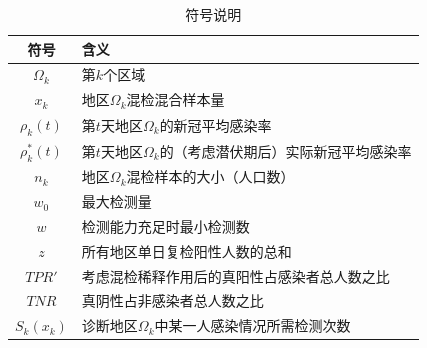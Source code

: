 \documentclass[withoutpreface,bwprint]{cumcmthesis} %
\begin{document}
\begin{table}[H] %
    \begin{center} %
    \caption{符号说明} %
    \begin{tabular}{cl} %
        \toprule %
        \multicolumn{1}{m{3cm}}{\centering 符号} %
        & \multicolumn{1}{m{10cm}}{ 含义} %
        \\ %
        \midrule %
        $\Omega_k$	&第$k$个区域\\
        $x_k$  &地区$\Omega_k$混检混合样本量\\
        $\rho_k(t)$	&第$t$天地区$\Omega_k$的新冠平均感染率\\
        $\rho^*_k(t)$ &第$t$天地区$\Omega_k$的（考虑潜伏期后）实际新冠平均感染率 \\
        $n_k$       &地区$\Omega_k$混检样本的大小（人口数）\\
        $w_0$       &最大检测量\\
        $w$	        &检测能力充足时最小检测数\\
        $z$         &所有地区单日复检阳性人数的总和\\
        $TPR'$      &考虑混检稀释作用后的真阳性占感染者总人数之比 \\
        $TNR$       &真阴性占非感染者总人数之比 \\
        $S_k(x_k)$    &诊断地区$\Omega_k$中某一人感染情况所需检测次数 \\
         \bottomrule
        \end{tabular} \label{tb:符号说明}%
    \end{center} %
\end{table} %
\end{document}
